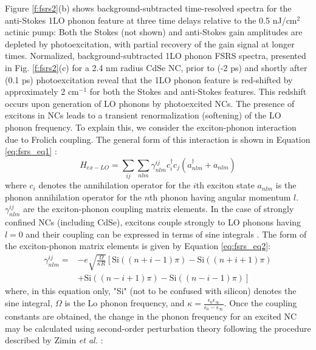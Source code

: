 Figure \ref{f:fsrs2}(b) shows background-subtracted time-resolved spectra for the anti-Stokes 1LO phonon feature at three time delays relative to the 0.5 nJ/cm$^2$ actinic pump: Both the Stokes (not shown) and anti-Stokes gain amplitudes are depleted by photoexcitation, with partial recovery of the gain signal at longer times. Normalized, background-subtracted 1LO phonon FSRS spectra, presented in Fig. \ref{f:fsrs2}(c) for a 2.4 nm radius CdSe NC, prior to (-2 ps) and shortly after (0.1 ps) photoexcitation reveal that the 1LO phonon feature is red-shifted by approximately 2 cm$^{-1}$ for both the Stokes and anti-Stokes features. This redshift occurs upon generation of LO phonons by photoexcited NCs. The presence of excitons in NCs leads to a transient renormalization (softening) of the LO phonon frequency. To explain this, we consider the exciton-phonon interaction due to Frolich coupling. The general form of this interaction is shown in Equation \ref{eq:fsrs_eq1} \cite{PhysRevLett.80.3105}:
\begin{equation} \label{eq:fsrs_eq1}
H_{ex-LO} = \sum_{ij}\sum_{nlm}\gamma_{nlm}^{ij}c_i^{\dagger}c_j\left(a_{nlm}^{\dagger}+a_{nlm}\right)
\end{equation}
where $c_i$ denotes the annihilation operator for the $i$th exciton state $a_{nlm}$ is the phonon annihilation operator for the $n$th phonon having angular momentum $l$.  $\gamma_{nlm}^{ij}$ are the exciton-phonon coupling matrix elements.  In the case of strongly confined NCs (including CdSe), excitons couple strongly to LO phonons having $l = 0$ and their coupling can be expressed in terms of sine integrals \cite{1996JETP...83..610F}.  The form of the exciton-phonon matrix elements is given by Equation \ref{eq:fsrs_eq2}:
\begin{equation} \label{eq:fsrs_eq2}
\begin{split}
\gamma_{nlm}^{ij} =& -e\sqrt{\frac{\Omega}{\kappa R}}\left[\mathrm{Si}\left(\left(n+i-1\right)\pi\right) - \mathrm{Si}\left(\left(n+i+1\right)\pi\right)\right. \\
&+ \left.\mathrm{Si}\left(\left(n-i+1\right)\pi\right) - \mathrm{Si}\left(\left(n-i-1\right)\pi\right) \right]
\end{split}
\end{equation}
where, in this equation only, "Si" (not to be confused with silicon) denotes the sine integral, $\Omega$ is the Lo phonon frequency, and $\kappa = \frac{\epsilon_0\epsilon_\infty}{\epsilon_0 - \epsilon_\infty}$.  Once the coupling constants are obtained, the change in the phonon frequency for an excited NC may be calculated using second-order perturbation theory following the procedure described by Zimin \emph{et al.} \cite{PhysRevLett.80.3105}:
